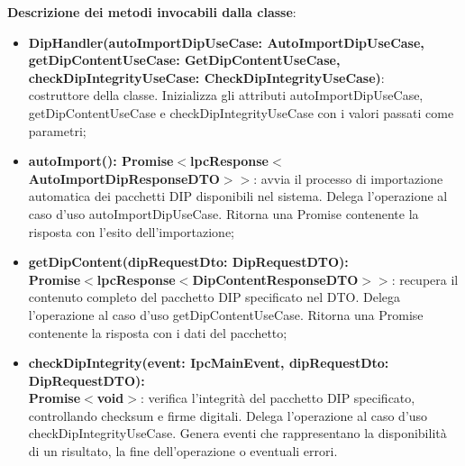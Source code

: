 \documentclass[a4paper,12pt]{article}
\begin{document}
{{{                \noindent \textbf{Descrizione dei metodi invocabili dalla classe}:
                \begin{itemize}
                    \item \textbf{DipHandler(autoImportDipUseCase: AutoImportDipUseCase,\\ getDipContentUseCase: GetDipContentUseCase,\\ checkDipIntegrityUseCase: CheckDipIntegrityUseCase)}:\\ costruttore della classe. Inizializza gli attributi autoImportDipUseCase, getDipContentUseCase e checkDipIntegrityUseCase con i valori passati come parametri;
                    \item \textbf{autoImport(): Promise$<$lpcResponse$<$AutoImportDipResponseDTO$>>$}: avvia il processo di importazione automatica dei pacchetti DIP disponibili nel sistema. Delega l'operazione al caso d'uso autoImportDipUseCase. Ritorna una Promise contenente la risposta con l'esito dell'importazione;
                    \item \textbf{getDipContent(dipRequestDto: DipRequestDTO):\\ Promise$<$lpcResponse$<$DipContentResponseDTO$>>$}: recupera il contenuto completo del pacchetto DIP specificato nel DTO. Delega l'operazione al caso d'uso getDipContentUseCase. Ritorna una Promise contenente la risposta con i dati del pacchetto;
                    \item \textbf{checkDipIntegrity(event: IpcMainEvent, dipRequestDto: DipRequestDTO):\\ Promise$<$void$>$}: verifica l'integrità del pacchetto DIP specificato, controllando checksum e firme digitali. Delega l'operazione al caso d'uso checkDipIntegrityUseCase. Genera eventi che rappresentano la disponibilità di un risultato, la fine dell'operazione o eventuali errori.
                \end{itemize}

}}}
\end{document}
